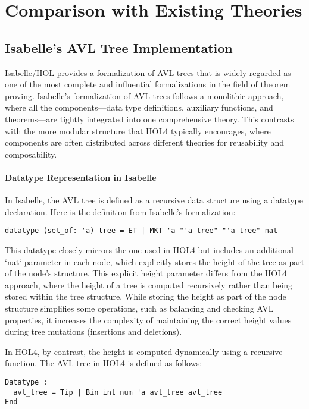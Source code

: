 \documentclass[12pt]{article}
\begin{document}
\section{Comparison with Existing Theories}

\subsection{Isabelle’s AVL Tree Implementation}

Isabelle/HOL \cite{IsabelleAVL} provides a formalization of AVL trees that is widely regarded as one of the most complete and influential formalizations in the field of theorem proving. Isabelle's formalization of AVL trees follows a monolithic approach, where all the components—data type definitions, auxiliary functions, and theorems—are tightly integrated into one comprehensive theory. This contrasts with the more modular structure that HOL4 typically encourages, where components are often distributed across different theories for reusability and composability.

\paragraph{Datatype Representation in Isabelle}
In Isabelle, the AVL tree is defined as a recursive data structure using a datatype declaration. Here is the definition from Isabelle’s formalization:

\begin{verbatim}
datatype (set_of: 'a) tree = ET | MKT 'a "'a tree" "'a tree" nat
\end{verbatim}

This datatype closely mirrors the one used in HOL4 but includes an additional `nat` parameter in each node, which explicitly stores the height of the tree as part of the node’s structure. This explicit height parameter differs from the HOL4 approach, where the height of a tree is computed recursively rather than being stored within the tree structure. While storing the height as part of the node structure simplifies some operations, such as balancing and checking AVL properties, it increases the complexity of maintaining the correct height values during tree mutations (insertions and deletions).

In HOL4, by contrast, the height is computed dynamically using a recursive function. The AVL tree in HOL4 is defined as follows:

\begin{verbatim}
Datatype :
  avl_tree = Tip | Bin int num 'a avl_tree avl_tree
End
\end{verbatim}
\end{document}

